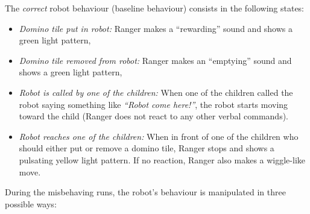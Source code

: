 \documentclass{sig-alternate}
\begin{document}
The \emph{correct} robot behaviour (baseline behaviour) consists in the
following states:

\begin{itemize}

    \item \emph{Domino tile put in robot:} Ranger makes a ``rewarding'' sound
        and shows a green light pattern,

    \item \emph{Domino tile removed from robot:} Ranger makes an ``emptying''
        sound and shows a green light pattern,

    \item \emph{Robot is called by one of the children:} When one of the
    children called the robot saying something like \textit{``Robot come
    here!''}, the robot starts moving toward the child (Ranger does not react to
    any other verbal commands).

    \item \emph{Robot reaches one of the children:} When in front of one of the
    children who should either put or remove a domino tile, Ranger stops and
    shows a pulsating yellow light pattern. If no reaction, Ranger also makes a
    wiggle-like move.

\end{itemize}

During the misbehaving runs, the robot's behaviour is manipulated in three
possible ways:
\end{document}
